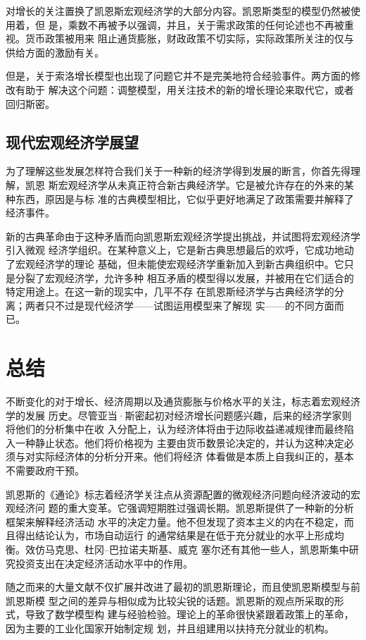 对增长的关注置换了凯恩斯宏观经济学的大部分内容。凯恩斯类型的模型仍然被使用着，但
是，乘数不再被予以强调，并且，关于需求政策的任何论述也不再被重视。货币政策被用来
阻止通货膨胀，财政政策不切实际，实际政策所关注的仅与供给方面的激励有关。

但是，关于索洛增长模型也出现了问题它并不是完美地符合经验事件。两方面的修改有助于
解决这个问题：调整模型，用关注技术的新的增长理论来取代它，或者回归斯密。

\subsection{现代宏观经济学展望}

为了理解这些发展怎样符合我们关于一种新的经济学得到发展的断言，你首先得理解，凯恩
斯宏观经济学从未真正符合新古典经济学。它是被允许存在的外来的某种东西，原因是与标
准的古典模型相比，它似乎更好地满足了政策需要并解释了经济事件。

新的古典革命由于这种矛盾而向凯恩斯宏观经济学提出挑战，并试图将宏观经济学引入微观
经济学组织。在某种意义上，它是新古典思想最后的欢呼，它成功地动了宏观经济学的理论
基础，但未能使宏观经济学重新加入到新古典组织中。它只是分裂了宏观经济学，允许多种
相互矛盾的模型得以发展，并被用在它们适合的特定用途上。在这一新的现实中，几平不存
在凯恩斯经济学与古典经济学的分离；两者只不过是现代经济学——试图运用模型来了解现
实——的不同方面而已。
\clearpage
\section{总结}

不断变化的对于增长、经济周期以及通货膨胀与价格水平的关注，标志着宏观经济学的发展
历史。尽管亚当·斯密起初对经济增长问题感兴趣，后来的经济学家则将他们的分析集中在收
入分配上，认为经济体将由于边际收益递减规律而最终陷入一种静止状态。他们将价格视为
主要由货币数景论决定的，并认为这种决定必须与对实际经济体的分析分开来。他们将经济
体看做是本质上自我纠正的，基本不需要政府干预。

凯恩斯的《通论》标志着经济学关注点从资源配置的微观经济问题向经济波动的宏观经济问
题的重大变革。它强调短期胜过强调长期。凯恩斯提供了一种新的分析框架来解释经济活动
水平的决定力量。他不但发现了资本主义的内在不稳定，而且得出结论认为，市场自动运行
的通常结果是在低于充分就业的水平上形成均衡。效仿马克思、杜冈--巴拉诺夫斯基、威克
塞尔还有其他一些人，凯恩斯集中研究投资支出在决定经济活动水平中的作用。

随之而来的大量文献不仅扩展并改进了最初的凯恩斯理论，而且使凯恩斯模型与前凯恩斯模
型之间的差异与相似成为比较尖锐的话题。凯恩斯的观点所采取的形式，导致了数学模型构
建与经验检验。理论上的革命很快紧跟着政策上的革命，因为主要的工业化国家开始制定规
划，并且组建用以扶持充分就业的机构。

